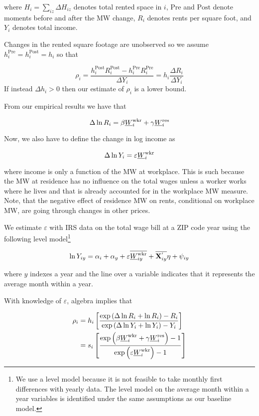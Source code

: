 where $H_i = \sum_{iz}\Delta H_{iz}$ denotes total rented space in $i$, 
$\text{Pre}$ and $\text{Post}$ denote moments before and after the MW change,
$R_i$ denotes rents per square foot, and 
$Y_i$ denotes total income.

Changes in the rented square footage are unobserved so we assume 
$h^{\text{Pre}}_i = h^{\text{Post}}_i = h_i$ so that

\begin{equation*}
	\rho_i = \frac{h^{\text{Post}}_i R^{\text{Post}}_i - h^{\text{Pre}}_i R^{\text{Pre}}_i}{\Delta Y_i} = 
	         h_i \frac{\Delta R_i}{\Delta Y_i}
\end{equation*}
If instead $\Delta h_i > 0$ then our estimate of $\rho_i$ is a lower bound.

From our empirical results we have that

\[
    \Delta \ln R_i = \beta \underline{W}_i^{\text{wkr}} + \gamma \underline{W}_i^{\text{res}}
\]

Now, we also have to define the change in log income as

\[
    \Delta \ln Y_i = \varepsilon \underline{W}_i^{\text{wkr}}
\]

where income is only a function of the MW at workplace. This is such because
the MW at residence has no influence on the total wages unless a worker works 
where he lives and that is already accounted for in the workplace MW measure. Note,
that the negative effect of residence MW on rents, conditional on workplace MW, are
going through changes in other prices. 

We estimate $\varepsilon$ with IRS data on the total wage bill at a ZIP code year using
the following level model\footnote{We use a level model because it is not feasible to 
take monthly first differences with yearly data. The level model on the average month 
within a year variables is identified under the same assumptions as our baseline model.} 

\begin{equation}
    \ln Y_{iy} = \alpha_i + \alpha_y + \varepsilon \overline{\underline{W}_{iy}^{\text{wkr}}} + 
                 \overline{\mathbf{X}^{'}_{iy}}\eta + \psi_{iy}
\end{equation}

where $y$ indexes a year and the line over a variable indicates that it represents 
the average month within a year.

With knowledge of $\varepsilon$, algebra implies that

\begin{equation}
	\begin{split}
		\rho_i & = h_i \left[ 
		\frac{\exp \left(\Delta \ln R_i + \ln R_i \right) - R_i }{\exp \left( \Delta \ln Y_i + \ln Y_i \right) - Y_i }
		\right] \\
		& = s_i \left[
		\frac{\exp \left( \beta \underline{W}_i^{\text{wkr}} + \gamma \underline{W}_i^{\text{res}} \right) - 1 }{\exp \left( \varepsilon \underline{W}_i^{\text{wkr}} \right) - 1 }
		\right]
	\end{split}
\end{equation}

